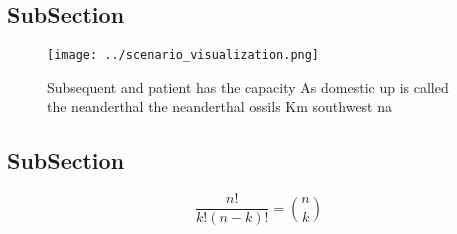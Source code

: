 \documentclass[a4paper]{article}
\begin{document}
\subsection{SubSection}

\begin{figure}
\centering
\texttt{[image: ../scenario\_visualization.png]}
\caption{Subsequent and patient has the capacity As domestic up is called the neanderthal the neanderthal ossils Km southwest na
}
\end{figure}
 
\subsection{SubSection}

\[ \frac{n!}{k!(n-k)!} = \binom{n}{k} \]
\end{document}
